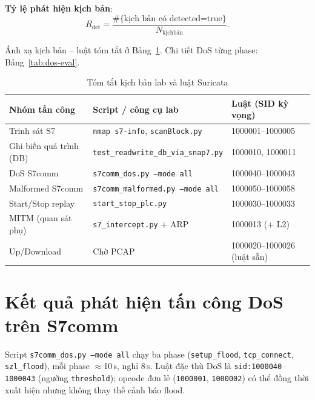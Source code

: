\documentclass[../main.tex]{subfiles}
\begin{document}
\textbf{Tỷ lệ phát hiện kịch bản}:
\begin{equation}
    R_{\mathrm{det}} = \frac{\#\{\text{kịch bản có detected=true}\}}{N_{\mathrm{kịch bản}}}.
\end{equation}

Ánh xạ kịch bản -- luật tóm tắt ở Bảng~\ref{tab:attack-eval-summary}. Chi tiết DoS từng phase: Bảng~\ref{tab:dos-eval}.

\begin{table}[H]
    \centering
    \footnotesize
    \begin{tabular}{|l|l|l|}
        \hline
        \textbf{Nhóm tấn công} & \textbf{Script / công cụ lab} & \textbf{Luật (SID kỳ vọng)} \\
        \hline
        Trinh sát S7 & \texttt{nmap s7-info}, \texttt{scanBlock.py} & 1000001--1000005 \\
        \hline
        Ghi biến quá trình (DB) & \texttt{test\_readwrite\_db\_via\_snap7.py} & 1000010, 1000011 \\
        \hline
        DoS S7comm & \texttt{s7comm\_dos.py --mode all} & 1000040--1000043 \\
        \hline
        Malformed S7comm & \texttt{s7comm\_malformed.py --mode all} & 1000050--1000058 \\
        \hline
        Start/Stop replay & \texttt{start\_stop\_plc.py} & 1000030--1000033 \\
        \hline
        MITM (quan sát phụ) & \texttt{s7\_intercept.py} + ARP & 1000013 (+ L2) \\
        \hline
        Up/Download & Chờ PCAP & 1000020--1000026 (luật sẵn) \\
        \hline
    \end{tabular}
    \caption{Tóm tắt kịch bản lab và luật Suricata}
    \label{tab:attack-eval-summary}
\end{table}

\section{Kết quả phát hiện tấn công DoS trên S7comm}
\label{sec:eval-dos}

Script \texttt{s7comm\_dos.py --mode all} chạy ba phase (\texttt{setup\_flood}, \texttt{tcp\_connect}, \texttt{szl\_flood}), mỗi phase $\approx$10\,s, nghỉ 8\,s. Luật đặc thù DoS là \texttt{sid:1000040}--\texttt{1000043} (ngưỡng \texttt{threshold}); opcode đơn lẻ (\texttt{1000001}, \texttt{1000002}) có thể đồng thời xuất hiện nhưng không thay thế cảnh báo flood.
\end{document}
